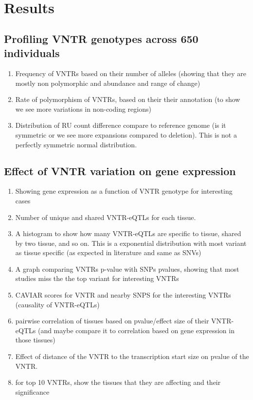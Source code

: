 \section{Results}\label{results}
\label{sec:results}
\subsection{Profiling VNTR genotypes across 650 individuals}
\begin{enumerate}
    \item Frequency of VNTRs based on their number of alleles (showing that they are mostly non polymorphic and abundance and range of change)
    \item Rate of polymorphism of VNTRs, based on their their annotation (to show we see more variations in non-coding regions)
    \item Distribution of RU count difference compare to reference genome (is it symmetric or we see more expansions compared to deletion). This is not a perfectly symmetric normal distribution.
\end{enumerate}

\subsection{Effect of VNTR variation on gene expression}

\begin{enumerate}
    \item Showing gene expression as a function of VNTR genotype for interesting cases
    
    \item Number of unique and shared VNTR-eQTLs for each tissue.
    
    \item A histogram to show how many VNTR-eQTLs are specific to tissue, shared by two tissue, and so on. This is a exponential distribution with most variant as tissue specific (as expected in literature and same as SNVs)
    
    \item A graph comparing VNTRs p-value with SNPs pvalues, showing that most studies miss the the top variant for interesting VNTRs
    
    \item CAVIAR scores for VNTR and nearby SNPS for the interesting VNTRs (causality of VNTR-eQTLs)
    
    \item pairwise correlation of tissues based on pvalue/effect size of their VNTR-eQTLs (and maybe compare it to correlation based on gene expression in those tissues)
    
    \item Effect of distance of the VNTR to the transcription start size on pvalue of the VNTR.
    
    \item for top 10 VNTRs, show the tissues that they are affecting and their significance
\end{enumerate}

